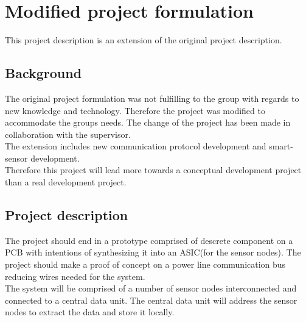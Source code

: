 \section{Modified project formulation}
This project description is an extension of the original project description. 
\subsection{Background}
The original project formulation was not fulfilling to the group with regards to new knowledge and technology. Therefore the project was modified to accommodate the groups needs. The change of the project has been made in collaboration with the supervisor.\\
The extension includes new communication protocol development and smart-sensor development.\\
Therefore this project will lead more towards a conceptual development project than a real development project.\\

\subsection{Project description}
The project should end in a prototype comprised of descrete component on a PCB with intentions of synthesizing it into an ASIC(for the sensor nodes). The project should make a proof of concept on a power line communication bus reducing wires needed for the system.\\
The system will be comprised of a number of sensor nodes interconnected and connected to a central data unit. The central data unit will address the sensor nodes to extract the data and store it locally.

